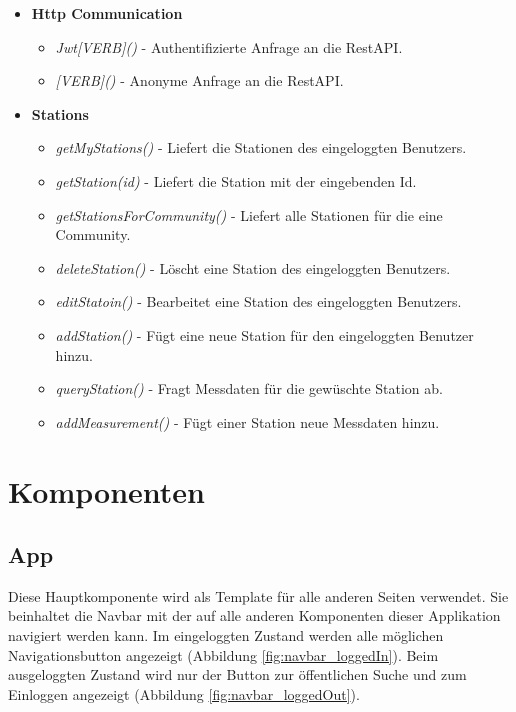 \documentclass[12pt, letterpaper]{article}
\begin{document}
\begin{itemize}
    \item \textbf{Http Communication}
    \begin{itemize}
        \item \textit{Jwt[VERB]()} - Authentifizierte Anfrage an die RestAPI.
        \item \textit{[VERB]()} - Anonyme Anfrage an die RestAPI.
    \end{itemize}
    
    \item \textbf{Stations}
    \begin{itemize}
        \item \textit{getMyStations()} - Liefert die Stationen des eingeloggten Benutzers.
        \item \textit{getStation(id)} - Liefert die Station mit der eingebenden Id.
        \item \textit{getStationsForCommunity()} - Liefert alle Stationen für die eine Community.
        \item \textit{deleteStation()} - Löscht eine Station des eingeloggten Benutzers.
        \item \textit{editStatoin()} - Bearbeitet eine Station des eingeloggten Benutzers.
         \item \textit{addStation()} - Fügt eine neue Station für den eingeloggten Benutzer hinzu.
        \item \textit{queryStation()} - Fragt Messdaten für die gewüschte Station ab.
        \item \textit{addMeasurement()} - Fügt einer Station neue Messdaten hinzu.

    \end{itemize}
\end{itemize}



\newpage
\section{Komponenten}

\subsection{App}

Diese Hauptkomponente wird als Template für alle anderen Seiten verwendet.
Sie beinhaltet die Navbar mit der auf alle anderen Komponenten dieser Applikation navigiert werden kann. Im eingeloggten Zustand werden alle möglichen Navigationsbutton angezeigt (Abbildung \ref{fig:navbar_loggedIn}). Beim ausgeloggten Zustand wird nur der Button zur öffentlichen Suche und zum Einloggen angezeigt (Abbildung \ref{fig:navbar_loggedOut}).
\end{document}
